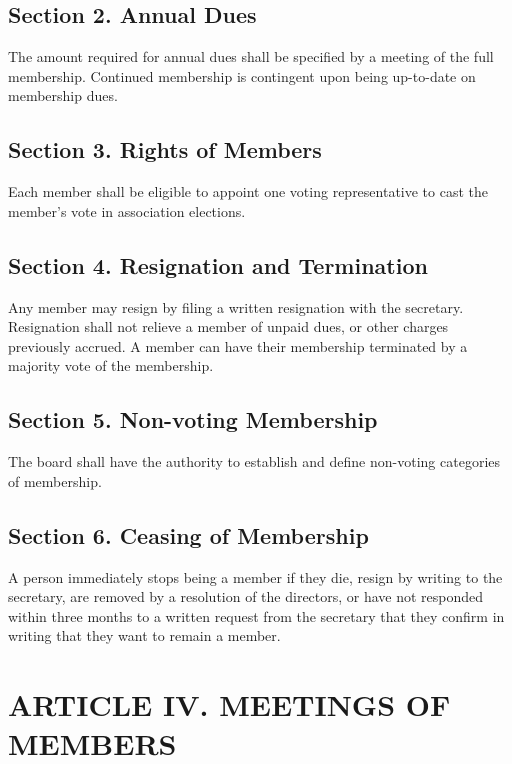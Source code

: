 \documentclass[a4paper]{article}
\begin{document}
\subsection*{Section 2. Annual Dues}

The amount required for annual dues shall be specified by a meeting of the full membership. Continued membership is contingent upon being up-to-date on membership dues.

\subsection*{Section 3. Rights of Members}

Each member shall be eligible to appoint one voting representative to cast the member's vote in association elections.

\subsection*{Section 4. Resignation and Termination}

Any member may resign by filing a written resignation with the secretary. Resignation shall not relieve a member of unpaid dues, or other charges previously accrued. A member can have their membership terminated by a majority vote of the membership.

\subsection*{Section 5. Non-voting Membership}

The board shall have the authority to establish and define non-voting categories of membership.

\subsection*{Section 6. Ceasing of Membership}

A person immediately stops being a member if they die, resign by writing to the secretary, are removed by a resolution of the directors, or have not responded within three months to a written request from the secretary that they confirm in writing that they want to remain a member.

\section*{ARTICLE IV. MEETINGS OF MEMBERS }
\end{document}
